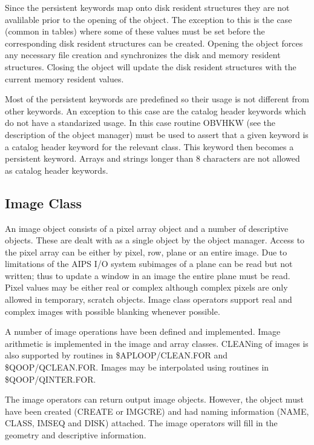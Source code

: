    Since the persistent keywords map onto disk resident structures
they are not avalilable prior to the opening of the object.  The
exception to this is the case (common in tables) where some of these
values must be set before the corresponding disk resident structures
can be created.  Opening the object forces any necessary file creation
and synchronizes the disk and memory resident structures.  Closing the
object will update the disk resident structures with the current
memory resident values.

   Most of the persistent keywords are predefined so their usage is not
different from other keywords.  An exception to this case are the
catalog header keywords which do not have a standarized usage.  In
this case routine OBVHKW (see the description of the object manager)
must be used to assert that a given keyword is a catalog header
keyword for the relevant class.  This keyword then becomes a
persistent keyword.  Arrays and strings longer than 8 characters are
not allowed as catalog header keywords.

\subsection{Image Class}
   An image object consists of a pixel array object and a number
of descriptive objects.  These are dealt with as a single object
by the object manager.  Access to the pixel array can be either
by pixel, row, plane or an entire image.  Due to limitations of the
AIPS I/O system subimages of a plane can be read but not written; thus
to update a window in an image the entire plane must be read.  Pixel
values may be either real or complex although complex pixels are only
allowed in temporary, scratch objects.  Image class operators support
real and complex images with possible blanking whenever possible.

   A number of image operations have been defined and implemented.
Image arithmetic is implemented in the image and array classes.
CLEANing of images is also supported by routines in
\$APLOOP/CLEAN.FOR and \$QOOP/QCLEAN.FOR.  Images may be interpolated
using routines in \$QOOP/QINTER.FOR.

     The image operators can return output image objects.  However,
the object must have been created (CREATE or IMGCRE) and had naming
information (NAME, CLASS, IMSEQ and DISK) attached.  The image
operators will fill in the geometry and descriptive information.


